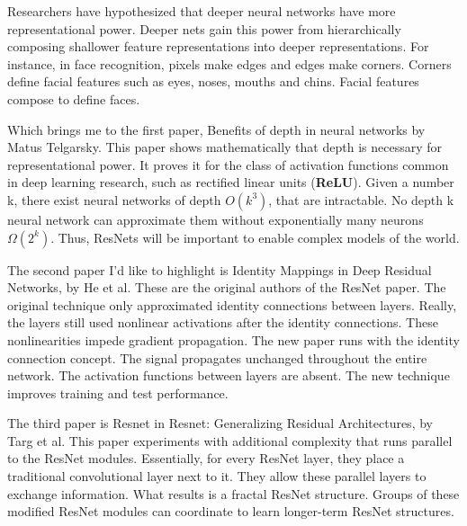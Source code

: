 \documentclass[12pt]{article}
\numberwithin{equation}{section}
\numberwithin{table}{section}
\numberwithin{figure}{section}
\begin{document}
Researchers have hypothesized that deeper neural networks have more representational power. Deeper nets gain this power from hierarchically composing shallower feature representations into deeper representations. For instance, in face recognition, pixels make edges and edges make corners. Corners define facial features such as eyes, noses, mouths and chins. Facial features compose to define faces.

Which brings me to the first paper, Benefits of depth in neural networks by Matus Telgarsky. This paper shows mathematically that depth is necessary for representational power. It proves it for the class of activation functions common in deep learning research, such as rectified linear units (\textbf{ReLU}). Given a number k, there exist neural networks of depth $O(k^3)$, that are intractable. No depth k neural network can approximate them without exponentially many neurons $Ω(2^k)$. Thus, ResNets will be important to enable complex models of the world.

The second paper I’d like to highlight is Identity Mappings in Deep Residual Networks, by He et al. These are the original authors of the ResNet paper. The original technique only approximated identity connections between layers. Really, the layers still used nonlinear activations after the identity connections. These nonlinearities impede gradient propagation. The new paper runs with the identity connection concept. The signal propagates unchanged throughout the entire network. The activation functions between layers are absent. The new technique improves training and test performance.



The third paper is Resnet in Resnet: Generalizing Residual Architectures, by Targ et al. This paper experiments with additional complexity that runs parallel to the ResNet modules. Essentially, for every ResNet layer, they place a traditional convolutional layer next to it. They allow these parallel layers to exchange information. What results is a fractal ResNet structure. Groups of these modified ResNet modules can coordinate to learn longer-term ResNet structures.

%
\end{document}
